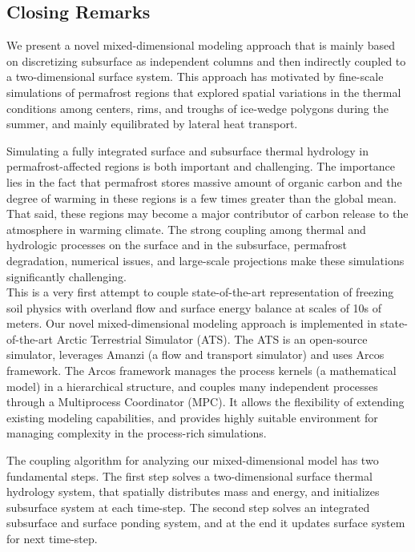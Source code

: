 \documentclass[review]{elsarticle}
\begin{document}
\subsection{Closing Remarks}
We present a novel mixed-dimensional modeling approach that is mainly based on discretizing subsurface as independent columns and then indirectly coupled to a two-dimensional surface system. This approach has motivated by fine-scale simulations of permafrost regions that explored spatial variations in the thermal conditions among centers, rims, and troughs of ice-wedge polygons during the summer, and mainly equilibrated by lateral heat transport.

Simulating a fully integrated surface and subsurface thermal hydrology in permafrost-affected regions is both important and challenging. The importance lies in the fact that permafrost stores massive amount of organic carbon and the degree of warming in these regions is a few times greater than the global mean. That said, these regions may become a major contributor of carbon release to the atmosphere in warming climate. The strong coupling among thermal and hydrologic processes on the surface and in the subsurface, permafrost degradation, numerical issues, and large-scale projections make these simulations significantly challenging. \\
This is a very first attempt to couple state-of-the-art representation of freezing soil physics with overland flow and surface energy balance at scales of 10s of meters.  Our novel mixed-dimensional modeling approach is implemented in state-of-the-art Arctic Terrestrial Simulator (ATS). The ATS is an open-source simulator, leverages Amanzi (a flow and transport simulator) and uses Arcos framework. The Arcos framework manages the process kernels (a mathematical model) in a hierarchical structure, and couples many independent processes through a Multiprocess Coordinator (MPC). It allows the flexibility of extending existing modeling capabilities, and provides highly suitable environment for managing complexity in the process-rich simulations.

The coupling algorithm for analyzing our mixed-dimensional model has two fundamental steps. The first step solves a two-dimensional surface thermal hydrology system, that spatially distributes mass and energy, and initializes subsurface system at each time-step. The second step solves an integrated subsurface and surface ponding system, and at the end it updates surface system for next time-step.
\end{document}
